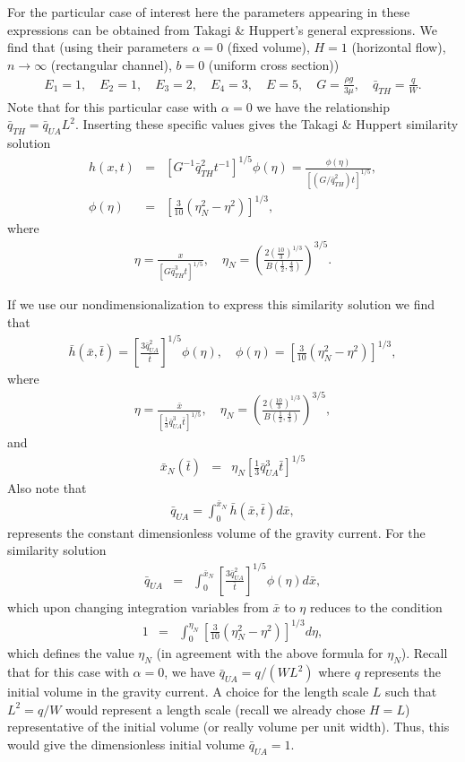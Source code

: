 \documentclass[11pt]{article}
\newcommand{\bea}{\begin{eqnarray}}
\newcommand{\eea}{\end{eqnarray}}
\begin{document}
For the particular case of interest here the parameters appearing in these expressions can be obtained from Takagi \& Huppert's general expressions.  We find that
(using their parameters $\alpha =0$ (fixed volume), $H=1$ (horizontal flow), $n \rightarrow \infty$ (rectangular channel), $b=0$ (uniform cross section))
\bea
E_1 = 1,\quad
E_2 = 1,\quad
E_3 = 2,\quad
E_4 = 3,\quad
E = 5,\quad
G = \frac{\rho g}{3\mu},\quad
\bar{q}_{TH} = \frac{q}{W}.
\eea
Note that for this particular case with $\alpha=0$ we have the relationship $\bar{q}_{TH} = \bar{q}_{UA} L^2$.
Inserting these specific values gives the Takagi \& Huppert similarity solution
\bea
h(x,t) & = & \left[ G^{-1} \bar{q}_{TH}^{2} t^{-1} \right]^{1/5} \phi(\eta) = \frac{\phi(\eta)}{\left[ (G /\bar{q}_{TH}^{2}) t \right]^{1/5}}, \\
\phi(\eta) & = & \left[ \frac{3}{10} \left( \eta_N^2 - \eta^2 \right) \right]^{1/3}, 
\eea
where
\bea
\eta = \frac{x}{\left[ G \bar{q}_{TH}^{3} t \right]^{1/5}},\quad
\eta_N = \left( \frac{2 \left( \frac{10}{3} \right)^{1/3} }{ B \left( \frac{1}{2}, \frac{4}{3}  \right) } \right)^{3/5}.
\eea

If we use our nondimensionalization to express this similarity solution we find that
\bea
\bar{h}(\bar{x},\bar{t})  =  \left[ \frac{ 3 \bar{q}_{UA}^{2} }{\bar{t} } \right]^{1/5} \phi(\eta), \quad
\phi(\eta)  =  \left[ \frac{3}{10} \left( \eta_N^2 - \eta^2 \right) \right]^{1/3}, 
\eea
where
\bea
\eta = \frac{\bar{x}}{\left[ \frac{1}{3} \bar{q}_{UA}^{3} \bar{t} \right]^{1/5}},\quad
\eta_N = \left( \frac{2 \left( \frac{10}{3} \right)^{1/3} }{ B \left( \frac{1}{2}, \frac{4}{3}  \right) } \right)^{3/5},
\eea
and
\bea
\bar{x}_N(\bar{t}) & = & \eta_N \left[ \frac{1}{3} \bar{q}_{UA}^{3} \bar{t} \right]^{1/5}
\eea
Also note that
\bea
\bar{q}_{UA} = \int_0^{\bar{x}_N} \bar{h}(\bar{x},\bar{t}) d\bar{x},
\eea
represents the constant dimensionless volume of the gravity current.  
For the similarity solution
\bea
\bar{q}_{UA} & = & \int_0^{\bar{x}_N} \left[ \frac{ 3 \bar{q}_{UA}^{2} }{\bar{t} } \right]^{1/5} \phi(\eta) d\bar{x},
\eea
which upon changing integration variables from $\bar{x}$ to $\eta$ reduces to the condition
\bea
1 & = & \int_0^{\eta_N} \left[ \frac{3}{10} (\eta_N^2 - \eta^2) \right]^{1/3} d\eta,
\eea
which defines the value $\eta_N$ (in agreement with the above formula for $\eta_N$).
Recall that for this case with $\alpha=0$, we have $\bar{q}_{UA} = q/(W L^2)$ where $q$ represents the initial volume in the gravity current.
A choice for the length scale $L$ such that $L^2 = q/W$ would represent a length scale (recall we already chose $H=L$) representative of the initial
volume (or really volume per unit width).  Thus, this would give the dimensionless initial volume $\bar{q}_{UA}=1$.
\end{document}
